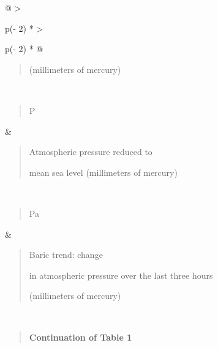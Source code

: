 \begin{longtable}[]{@{}
  >{\raggedright\arraybackslash}p{(\columnwidth - 2\tabcolsep) * }
  >{\raggedright\arraybackslash}p{(\columnwidth - 2\tabcolsep) * }@{}}
\begin{minipage}[t]{\linewidth}
\begin{quote}
(millimeters of mercury)
\end{quote}
\end{minipage} \\
\begin{minipage}[t]{\linewidth}\raggedright
\begin{quote}
P
\end{quote}
\end{minipage} & \begin{minipage}[t]{\linewidth}\raggedright
\begin{quote}
Atmospheric pressure reduced to

mean sea level (millimeters of mercury)
\end{quote}
\end{minipage} \\
\begin{minipage}[t]{\linewidth}\raggedright
\begin{quote}
Pa
\end{quote}
\end{minipage} & \begin{minipage}[t]{\linewidth}\raggedright
\begin{quote}
Baric trend: change

in atmospheric pressure over the last three hours

(millimeters of mercury)
\end{quote}
\end{minipage} \\
\end{longtable}

\begin{quote}
\textbf{Continuation of Table 1}
\end{quote}

